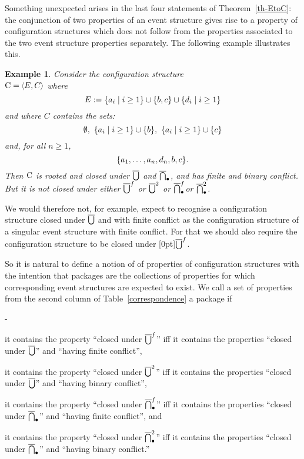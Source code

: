 \documentclass[twocolumn]{article}
\newtheorem{exam}{Example}
\newenvironment{example}[1]{\begin{exam} \rm \label{ex-#1} }{\end{exam}}
\newcommand{\thm}[1]{Theorem~\ref{th-#1}}
\newenvironment{itemise2}{\begin{list}{{\bf --}}{\leftmargin 15pt
                        \labelwidth\leftmargini\advance\labelwidth-\labelsep
                        \topsep 2pt \itemsep 1pt \parsep 1pt}}{\end{list}}
\newcommand{\phrase}[1]{\index{#1}{\em #1}}		\newcommand{\implies}{\Rightarrow}
\begin{document}
Something unexpected arises in the last four statements of \thm{EtoC}:
the conjunction of two properties of an event structure gives rise to
a property of configuration structures which does not follow
from the properties associated to the two event structure properties
separately. The following example illustrates this.
\begin{example}{strange}
Consider the configuration structure\\  $\eC=\tuple{E,C}$ where\vspace{-1ex}
 $$E := \{a_i \mid i \geq 1\}  \cup \{b,c\} \cup  \{d_i \mid i \geq 1\} \vspace{-1ex}$$
 and where $C$ contains the sets:\vspace{-1ex}
 $$\emptyset,~ \{a_i \mid i \geq 1\} \cup \{b\},~ \{a_i \mid i \geq 1\}
 \cup \{c\}\vspace{-1ex}$$
 and, for all $n\geq 1$,\vspace{-1ex}
$$ \{a_1, \ldots, a_{n},d_n,b,c \}.\vspace{-1ex}$$
Then ${\rm C}$ is rooted and closed under $\overline{\bigcup}$ and $\overline{\bigcap}_{\bullet}$, and
has finite and binary conflict. But it is not closed under either
$\overline{\bigcup}^f$ or $\overline{\bigcup}^2$ or $\overline{\bigcap}_{\bullet}^f$or $\overline{\bigcap}_{\bullet}^2$.
\end{example}
We would therefore not, for example, expect to recognise a configuration
structure closed under $\overline{\bigcup}$ and with finite conflict as
the configuration structure of a singular event structure with finite conflict.
For that we should also require the configuration structure to be closed under
\raisebox{-1.5pt}[0pt]{$\overline{\bigcup}^f$}.

So it is natural to define a notion of \phrase{package} of properties of
configuration structures with the intention that packages are the collections of
properties for which corresponding event structures are expected to exist.
We call a set of properties from the second column of
Table~\ref{correspondence} a {package }if
\begin{itemise2}
\itemsep 0pt
\item it contains the property
``closed under $\overline{\bigcup}^f$'' iff it contains the properties
``closed under $\overline{\bigcup}$'' and ``having finite conflict'',
\item it contains the property
``closed under $\overline{\bigcup}^2$'' iff  it contains the properties
``closed under $\overline{\bigcup}$'' and ``having binary conflict'',
\item it contains the property
``closed under $\overline{\bigcap}_{\bullet}^f$'' iff it contains the properties
``closed under $\overline{\bigcap}_{\bullet}$'' and ``having finite conflict'', and
\item it contains the property
``closed under $\overline{\bigcap}_{\bullet}^2$'' iff it contains the properties
``closed under $\overline{\bigcap}_{\bullet}$'' and ``having binary conflict.''
\vspace{2pt}
\end{itemise2}
\end{document}
